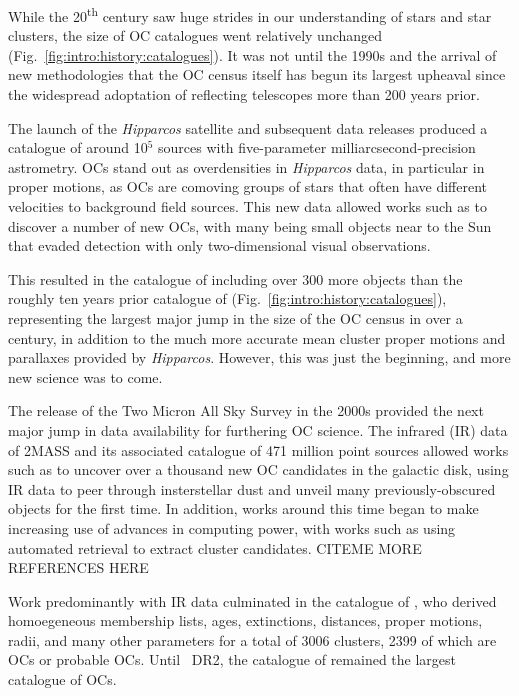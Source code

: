 While the 20\textsuperscript{th} century saw huge strides in our understanding of stars and star clusters, the size of OC catalogues went relatively unchanged (Fig.~\ref{fig:intro:history:catalogues}). It was not until the 1990s and the arrival of new methodologies that the OC census itself has begun its largest upheaval since the widespread adoptation of reflecting telescopes more than 200 years prior.

The launch of the \emph{Hipparcos} satellite and subsequent data releases \citep{perryman_hipparcos_1997} produced a catalogue of around 10$^5$ sources with five-parameter milliarcsecond-precision astrometry. OCs stand out as overdensities in \emph{Hipparcos} data, in particular in proper motions, as OCs are comoving groups of stars that often have different velocities to background field sources. This new data allowed works such as \cite{platais_search_1998} to discover a number of new OCs, with many being small objects near to the Sun that evaded detection with only two-dimensional visual observations. 

This resulted in the catalogue of \cite{dias_new_2002} including over 300 more objects than the roughly ten years prior catalogue of \cite{mermilliod_database_1995} (Fig.~\ref{fig:intro:history:catalogues}), representing the largest 
major jump in the size of the OC census in over a century, in addition to the much more accurate mean cluster proper motions and parallaxes provided by \emph{Hipparcos}. However, this was just the beginning, and more new science was to come.

The release of the Two Micron All Sky Survey \citep[2MASS,][]{skrutskie_two_2006} in the 2000s provided the next major jump in data availability for furthering OC science. The infrared (IR) data of 2MASS and its associated catalogue of 471 million point sources allowed works such as \cite{froebrich_systematic_2007} to uncover over a thousand new OC candidates in the galactic disk, using IR data to peer through insterstellar dust and unveil many previously-obscured objects for the first time. In addition, works around this time began to make increasing use of advances in computing power, with works such as \cite{froebrich_systematic_2007} using automated retrieval to extract cluster candidates. CITEME MORE REFERENCES HERE

Work predominantly with IR data culminated in the catalogue of \cite{kharchenko_global_2013}, who derived homoegeneous membership lists, ages, extinctions, distances, proper motions, radii, and many other parameters for a total of 3006 clusters, 2399 of which are OCs or probable OCs. Until \gaia\ DR2, the catalogue of \cite{kharchenko_global_2013} remained the largest catalogue of OCs.

